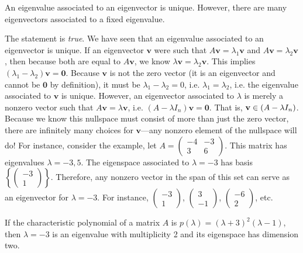 \documentclass[11pt,letterpaper]{article}
\begin{document}
 An eigenvalue associated to an eigenvector is unique. However, there are many eigenvectors associated to a fixed eigenvalue. \pspace

\sol The statement is \textit{true}. We have seen that an eigenvalue associated to an eigenvector is unique. If an eigenvector $\mathbf{v}$ were such that $A\mathbf{v}= \lambda_1 \mathbf{v}$ and $A\mathbf{v}= \lambda_2 \mathbf{v}$, then because both are equal to $A\mathbf{v}$, we know $\lambda \mathbf{v}= \lambda_2 \mathbf{v}$. This implies $(\lambda_1 - \lambda_2)\mathbf{v}= \mathbf{0}$. Because $\mathbf{v}$ is not the zero vector (it is an eigenvector and cannot be $\mathbf{0}$ by definition), it must be $\lambda_1 - \lambda_2= 0$, i.e. $\lambda_1= \lambda_2$, i.e. the eigenvalue associated to $\mathbf{v}$ is unique. However, an eigenvector associated to $\lambda$ is merely a nonzero vector such that $A\mathbf{v}= \lambda \mathbf{v}$, i.e. $(A - \lambda I_n)\mathbf{v}= \mathbf{0}$. That is, $\mathbf{v} \in \null (A - \lambda I_n)$. Because we know this nullspace must consist of more than just the zero vector, there are infinitely many choices for $\mathbf{v}$---any nonzero element of the nullspace will do! For instance, consider the example, let $A= \begin{pmatrix} -4 & -3 \\ 3 & 6 \end{pmatrix}$. This matrix has eigenvalues $\lambda= -3, 5$. The eigenspace associated to $\lambda= -3$ has basis $\left\{ \begin{pmatrix} -3 \\ 1 \end{pmatrix} \right\}$. Therefore, any nonzero vector in the span of this set can serve as an eigenvector for $\lambda= -3$. For instance, $\begin{pmatrix} -3 \\ 1 \end{pmatrix}$, $\begin{pmatrix} 3 \\ -1 \end{pmatrix}$, $\begin{pmatrix} -6 \\ 2 \end{pmatrix}$, etc. \pvspace{1.3cm}



 If the characteristic polynomial of a matrix $A$ is $p(\lambda)= (\lambda + 3)^2 (\lambda - 1)$, then $\lambda= -3$ is an eigenvalue with multiplicity 2 and its eigenspace has dimension two. \pspace
\end{document}
